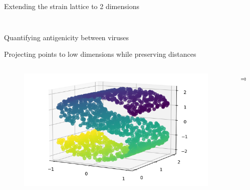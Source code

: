 \documentclass{beamer}
\begin{document}
\begin{frame}{Extending the strain lattice to 2 dimensions}
\begin{columns}
\begin{column}{0.5\textwidth}
\begin{figure}
            \end{figure}
        \end{column}
    \end{columns}
    \centering
    \vfill
    \tiny{\cite{gogDynamicsSelectionManystrain2002}}

\end{frame}


\begin{frame}{Quantifying antigenicity between viruses}
    \begin{figure}
        \centering
        \scalebox{0.9}{
        
        }
    \end{figure}
\end{frame}



\begin{frame}{Projecting points to low dimensions while preserving distances}
    \begin{columns}
        \begin{column}{0.4\textwidth}
            \begin{figure}
                \includegraphics[width=1.4\textwidth]{standalone/mds_1.png}
                
            \end{figure}   
        \end{column}
        \begin{column}{0.01\textwidth}
            \huge{$\Longrightarrow$}
            
        \end{column}
        \begin{column}{0.4\textwidth}
            
        \end{column}
    \end{columns}
    \centering
    \vfill
    \tiny{\cite{scikit-learn}}
\end{frame}
\end{document}
